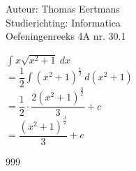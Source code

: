 \documentclass[a4paper]{article}
\begin{document}
  
\noindent \large Auteur: Thomas Eertmans \\
\noindent \large Studierichting: Informatica\\
\noindent \large Oefeningenreeks 4A nr. 30.1\\

\medskip

\normalsize

$\displaystyle\int x \sqrt{x^2+1} \ dx$ \\

$= \dfrac{1}{2} \displaystyle\int \left(x^2+1\right)^{\tfrac{1}{2}} \ d(x^2+1)$ \\

$= \dfrac{1}{2} \cdot \dfrac{2(x^2+1)^{\tfrac{3}{2}}}{3} + c$ \\

$= \dfrac{(x^2+1)^{\tfrac{3}{2}}}{3} + c$

\begin{thebibliography}{999}
\end{thebibliography}
\end{document}
